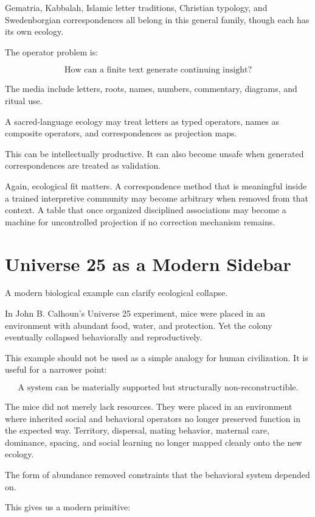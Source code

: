 \documentclass[11pt]{book}
\begin{document}
Gematria, Kabbalah, Islamic letter traditions, Christian typology, and Swedenborgian correspondences all belong in this general family, though each has its own ecology.

The operator problem is:

\[
\text{How can a finite text generate continuing insight?}
\]

The media include letters, roots, names, numbers, commentary, diagrams, and ritual use.

A sacred-language ecology may treat letters as typed operators, names as composite operators, and correspondences as projection maps.

This can be intellectually productive. It can also become unsafe when generated correspondences are treated as validation.

Again, ecological fit matters. A correspondence method that is meaningful inside a trained interpretive community may become arbitrary when removed from that context. A table that once organized disciplined associations may become a machine for uncontrolled projection if no correction mechanism remains.

\section{Universe 25 as a Modern Sidebar}

A modern biological example can clarify ecological collapse.

In John B. Calhoun's Universe 25 experiment, mice were placed in an environment with abundant food, water, and protection. Yet the colony eventually collapsed behaviorally and reproductively.

This example should not be used as a simple analogy for human civilization. It is useful for a narrower point:

\[
\text{A system can be materially supported but structurally non-reconstructible.}
\]

The mice did not merely lack resources. They were placed in an environment where inherited social and behavioral operators no longer preserved function in the expected way. Territory, dispersal, mating behavior, maternal care, dominance, spacing, and social learning no longer mapped cleanly onto the new ecology.

The form of abundance removed constraints that the behavioral system depended on.

This gives us a modern primitive:
\end{document}
